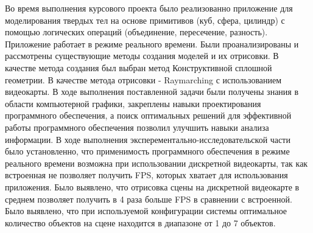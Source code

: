 \Conclusion %
 
Во время выполнения курсового проекта было реализованно приложение для моделирования твердых тел
на основе примитивов (куб, сфера, цилиндр) с помощью
логических операций (объединение, пересечение, разность). Приложение работает в режиме реального времени.
Были проанализированы и рассмотрены существующие методы создания моделей и их отрисовки.
В качестве метода создания был выбран метод Конструктивной сплошной геометрии.
В качестве метода отрисовки - Raymarching с использованием видеокарты.
В ходе выполнения поставленной задачи были получены знания в области компьютерной графики,
закреплены навыки проектирования программного обеспечения, а поиск оптимальных решений для эффективной работы программного обеспечения позволил улучшить навыки анализа информации.
 В ходе выполнения эксперементально-исследовательской части было
установленно, что применимость программного обеспечения в режиме реального
времени возможна при использовании дискретной видеокарты, так как встроенная
не позволяет получить FPS, которых хватает для использования приложения. Было выявлено,
что отрисовка сцены на дискретной видеокарте в среднем позволяет получить в 4 раза больше
FPS в сравнении с встроенной. Было выявлено, что при используемой конфигурации системы оптимальное количество объектов на сцене находится в диапазоне от 1 до 7 объектов.
 
 
 

